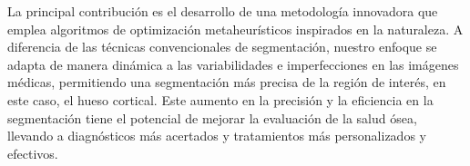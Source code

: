 \documentclass[conference]{IEEEtran}
\begin{document}



\noindent La principal contribución es el desarrollo de una metodología innovadora que emplea algoritmos de optimización metaheurísticos inspirados en la naturaleza. A diferencia de las técnicas convencionales de segmentación, nuestro enfoque se adapta de manera dinámica a las variabilidades e imperfecciones en las imágenes médicas, permitiendo una segmentación más precisa de la región de interés, en este caso, el hueso cortical. Este aumento en la precisión y la eficiencia en la segmentación tiene el potencial de mejorar la evaluación de la salud ósea, llevando a diagnósticos más acertados y tratamientos más personalizados y efectivos. 
\end{document}
